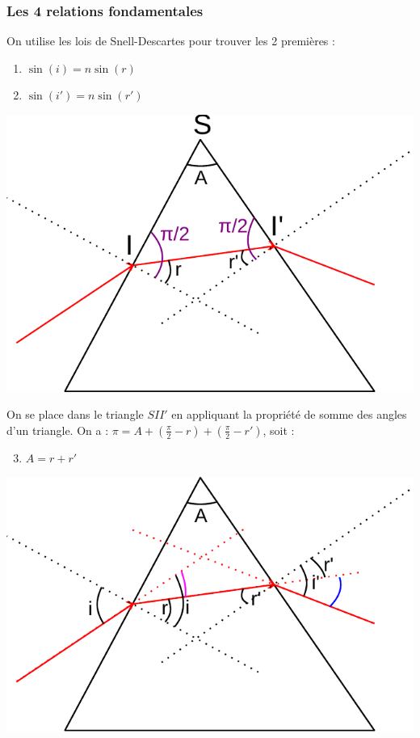 \documentclass[french]{yLectureNote}
\begin{document}
\subsubsection{Les 4 relations fondamentales}
On utilise les lois de Snell-Descartes pour trouver les 2 premières :
\begin{enumerate}
	 \item \(\sin(i) = n\sin(r)\)
	 \item \(\sin(i') = n\sin(r')\)
	\end{enumerate}
	\includegraphics[scale=0.4]{prisme_2}

	On se place dans le triangle $SII'$ en appliquant la propriété de somme des angles d'un triangle. On a : \( \pi = A + (\frac{\pi}{2}-r) + (\frac{\pi}{2}-r')\), soit :
	\begin{enumerate}
	\setcounter{enumi}{2}
	 \item \(A = r+r'\)
	\end{enumerate}
	\includegraphics[scale=0.4]{prisme_3}
\end{document}
